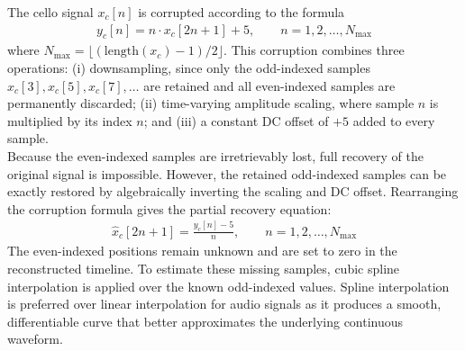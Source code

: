\documentclass[12pt, a4paper]{article}
\begin{document}
The cello signal $x_c[n]$ is corrupted according to the formula
\begin{align*}
    y_c[n] = n \cdot x_c[2n+1] + 5, \qquad n = 1, 2, \ldots, N_{\max}
\end{align*}
where $N_{\max} = \lfloor(\text{length}(x_c) - 1)/2\rfloor$. This corruption combines three operations: (i) downsampling, since only the odd-indexed samples $x_c[3], x_c[5], x_c[7], \ldots$ are retained and all even-indexed samples are permanently discarded; (ii) time-varying amplitude scaling, where sample $n$ is multiplied by its index $n$; and (iii) a constant DC offset of $+5$ added to every sample.\\
Because the even-indexed samples are irretrievably lost, full recovery of the original signal is impossible. However, the retained odd-indexed samples can be exactly restored by algebraically inverting the scaling and DC offset. Rearranging the corruption formula gives the partial recovery equation:
\begin{align*}
    \hat{x}_c[2n+1] = \frac{y_c[n] - 5}{n}, \qquad n = 1, 2, \ldots, N_{\max}
\end{align*}
The even-indexed positions remain unknown and are set to zero in the reconstructed timeline. To estimate these missing samples, cubic spline interpolation is applied over the known odd-indexed values. Spline interpolation is preferred over linear interpolation for audio signals as it produces a smooth, differentiable curve that better approximates the underlying continuous waveform.
\end{document}
